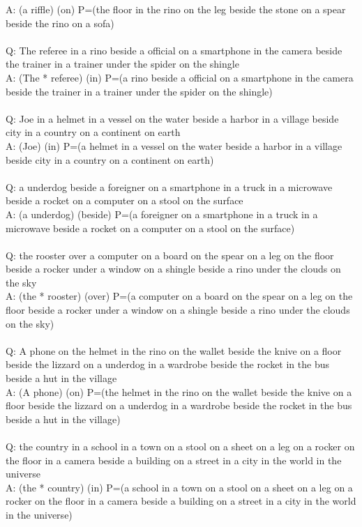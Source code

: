 \documentclass{article} \usepackage{iclr2022_conference,times}
\begin{document}
{A: (a riffle) (on) P=(the floor in the rino on the leg beside the stone on a spear beside the rino on a sofa) \\
 \\
Q: The referee in a rino beside a official on a smartphone in the camera beside the trainer in a trainer under the spider on the shingle \\
A: (The * referee) (in) P=(a rino beside a official on a smartphone in the camera beside the trainer in a trainer under the spider on the shingle) \\
 \\
Q: Joe in a helmet in a vessel on the water beside a harbor in a village beside city in a country on a continent on earth \\
A: (Joe) (in) P=(a helmet in a vessel on the water beside a harbor in a village beside city in a country on a continent on earth) \\
 \\
Q: a underdog beside a foreigner on a smartphone in a truck in a microwave beside a rocket on a computer on a stool on the surface \\
A: (a underdog) (beside) P=(a foreigner on a smartphone in a truck in a microwave beside a rocket on a computer on a stool on the surface) \\
 \\
Q: the rooster over a computer on a board on the spear on a leg on the floor beside a rocker under a window on a shingle beside a rino under the clouds on the sky \\
A: (the * rooster) (over) P=(a computer on a board on the spear on a leg on the floor beside a rocker under a window on a shingle beside a rino under the clouds on the sky) \\
 \\
Q: A phone on the helmet in the rino on the wallet beside the knive on a floor beside the lizzard on a underdog in a wardrobe beside the rocket in the bus beside a hut in the village \\
A: (A phone) (on) P=(the helmet in the rino on the wallet beside the knive on a floor beside the lizzard on a underdog in a wardrobe beside the rocket in the bus beside a hut in the village) \\
 \\
Q: the country in a school in a town on a stool on a sheet on a leg on a rocker on the floor in a camera beside a building on a street in a city in the world in the universe \\
A: (the * country) (in) P=(a school in a town on a stool on a sheet on a leg on a rocker on the floor in a camera beside a building on a street in a city in the world in the universe)
}
\end{document}
